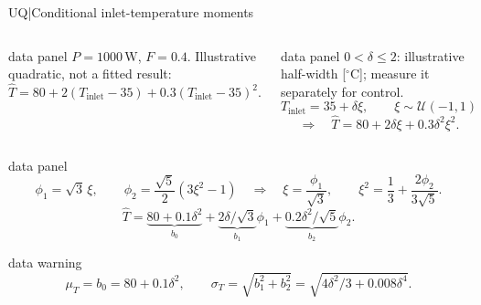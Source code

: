 \begin{frame}{UQ\enspace|\enspace Conditional inlet-temperature moments}
  \footnotesize
  \setlength{\abovedisplayskip}{2pt}
  \setlength{\belowdisplayskip}{2pt}
  \setlength{\abovedisplayshortskip}{1pt}
  \setlength{\belowdisplayshortskip}{1pt}
  \begin{columns}[T,onlytextwidth]
      \begin{beamercolorbox}[sep=1.5mm,wd=\linewidth]{data panel}
        $P=1000\,\mathrm W$, $F=0.4$. Illustrative quadratic, not a fitted result:
        \[
          \widehat T=80+2(T_{\mathrm{inlet}}-35)
            +0.3(T_{\mathrm{inlet}}-35)^2.
        \]
      \end{beamercolorbox}
      \begin{beamercolorbox}[sep=1.5mm,wd=\linewidth]{data panel}
        $0<\delta\leq2$: illustrative half-width [${}^\circ$C]; measure it separately for control.
        \[
          T_{\mathrm{inlet}}=35+\delta\xi,\qquad \xi\sim\mathcal U(-1,1)
        \]
        \[
          \Longrightarrow\quad\widehat T=80+2\delta\xi+0.3\delta^2\xi^2.
        \]
      \end{beamercolorbox}
  \end{columns}
  \smallskip
  \begin{beamercolorbox}[sep=1.5mm,wd=\textwidth]{data panel}
    \[
      \phi_1=\sqrt3\,\xi,\qquad
      \phi_2=\frac{\sqrt5}{2}(3\xi^2-1)
      \quad\Longrightarrow\quad
      \xi=\frac{\phi_1}{\sqrt3},\qquad
      \xi^2=\frac13+\frac{2\phi_2}{3\sqrt5}.
    \]
    \[
      \widehat T
        =\underbrace{80+0.1\delta^2}_{b_0}
             +\underbrace{2\delta/\sqrt3}_{b_1}\phi_1
             +\underbrace{0.2\delta^2/\sqrt5}_{b_2}\phi_2.
    \]
  \end{beamercolorbox}
  \smallskip
  \begin{beamercolorbox}[sep=1.5mm,wd=\textwidth]{data warning}
    \[
      \mu_T=b_0=80+0.1\delta^2,\qquad
      \sigma_T=\sqrt{b_1^2+b_2^2}
        =\sqrt{4\delta^2/3+0.008\delta^4}.
    \]
  \end{beamercolorbox}
\end{frame}

